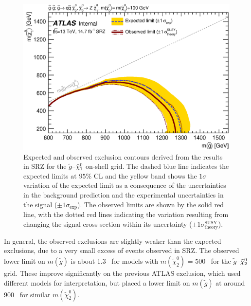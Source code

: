 \begin{figure}[!htb]
\centering
\includegraphics[width=.8\textwidth]{figures/interpretation/excl_SM_GG_N2.eps}
\caption{
Expected and observed exclusion contours derived from the results in SRZ for the $\tilde{g}$--$\tilde{\chi}_1^0$ on-shell grid. 
The dashed blue line indicates the expected limits at $95\%$ CL and the yellow band shows the $1\sigma$ variation of the expected limit as a consequence of the uncertainties in the background prediction and the experimental uncertainties in the signal ($\pm1\sigma_\text{exp}$). 
The observed limits are shown by the solid red line, with the dotted red lines indicating the variation resulting from changing the signal cross section within its uncertainty ($\pm1\sigma^\text{SUSY}_\text{theory}$).
\label{fig:excl_SMGGN2}
}
\end{figure}

In general, the observed exclusions are slightly weaker than the expected exclusions, due to a very small excess of events observed in SRZ. The observed lower limit on $m(\tilde{g})$ is about 1.3 \tev~for models with $m(\tilde{\chi}^{0}_{2})$ = 500 \gev~for the $\tilde{g}$--$\tilde{\chi}_2^0$ grid. These improve significantly on the previous ATLAS exclusion, which used different models for interpretation, but placed a lower limit on $m(\tilde{g})$ at around 900 \gev~for similar $m(\tilde{\chi}^{0}_{2})$. 



